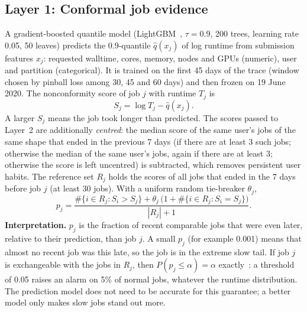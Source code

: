 \documentclass[10pt,a4paper]{article}
\begin{document}
\subsection{Layer 1: Conformal job evidence}
A gradient-boosted quantile model (LightGBM~\cite{lightgbm}, $\tau = 0.9$, 200 trees, learning rate 0.05, 50 leaves) predicts the 0.9-quantile $\hat q(x_j)$ of log runtime from submission features $x_j$: requested walltime, cores, memory, nodes and GPUs (numeric), user and partition (categorical). It is trained on the first 45 days of the trace (window chosen by pinball loss among 30, 45 and 60 days) and then frozen on 19 June 2020. The nonconformity score of job $j$ with runtime $T_j$ is
\begin{equation}
S_j = \log T_j - \hat q(x_j).
\end{equation}
A larger $S_j$ means the job took longer than predicted. The scores passed to Layer~2 are additionally \emph{centred}: the median score of the same user's jobs of the same shape that ended in the previous 7 days (if there are at least 3 such jobs; otherwise the median of the same user's jobs, again if there are at least 3; otherwise the score is left uncentred) is subtracted, which removes persistent user habits. The reference set $R_j$ holds the scores of all jobs that ended in the 7 days before job $j$ (at least 30 jobs). With a uniform random tie-breaker $\theta_j$,
\begin{equation}
p_j = \frac{\#\{i \in R_j : S_i > S_j\} + \theta_j\,\bigl(1 + \#\{i \in R_j : S_i = S_j\}\bigr)}{|R_j| + 1}.
\end{equation}
\textbf{Interpretation.} $p_j$ is the fraction of recent comparable jobs that were even later, relative to their prediction, than job $j$. A small $p_j$ (for example 0.001) means that almost no recent job was this late, so the job is in the extreme slow tail. If job $j$ is exchangeable with the jobs in $R_j$, then $P(p_j \le \alpha) = \alpha$ exactly~\cite{cqr}: a threshold of 0.05 raises an alarm on 5\% of normal jobs, whatever the runtime distribution. The prediction model does not need to be accurate for this guarantee; a better model only makes slow jobs stand out more.
\end{document}
